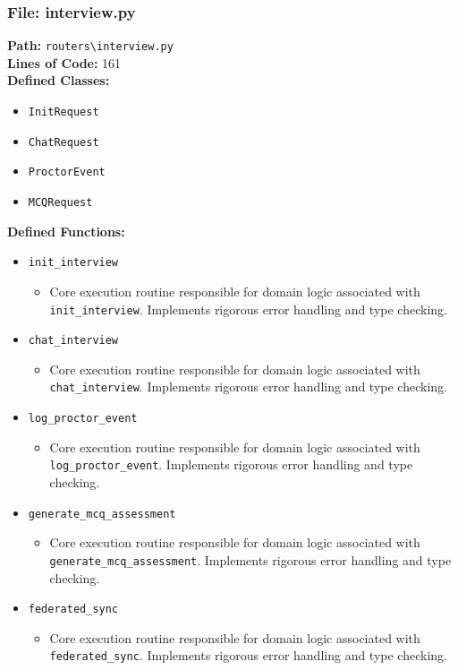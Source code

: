 \documentclass[10pt,journal,compsoc]{IEEEtran}
\begin{document}
\subsubsection{File: interview.py}
\textbf{Path:} \texttt{routers\textbackslash{}interview.py} \\
\textbf{Lines of Code:} 161 \\
\textbf{Defined Classes:}
\begin{itemize}
    \item \texttt{InitRequest}
    \item \texttt{ChatRequest}
    \item \texttt{ProctorEvent}
    \item \texttt{MCQRequest}
\end{itemize}
\textbf{Defined Functions:}
\begin{itemize}
    \item \texttt{init\_interview}
    \begin{itemize} \item Core execution routine responsible for domain logic associated with \texttt{init\_interview}. Implements rigorous error handling and type checking. \end{itemize}
    \item \texttt{chat\_interview}
    \begin{itemize} \item Core execution routine responsible for domain logic associated with \texttt{chat\_interview}. Implements rigorous error handling and type checking. \end{itemize}
    \item \texttt{log\_proctor\_event}
    \begin{itemize} \item Core execution routine responsible for domain logic associated with \texttt{log\_proctor\_event}. Implements rigorous error handling and type checking. \end{itemize}
    \item \texttt{generate\_mcq\_assessment}
    \begin{itemize} \item Core execution routine responsible for domain logic associated with \texttt{generate\_mcq\_assessment}. Implements rigorous error handling and type checking. \end{itemize}
    \item \texttt{federated\_sync}
    \begin{itemize} \item Core execution routine responsible for domain logic associated with \texttt{federated\_sync}. Implements rigorous error handling and type checking. \end{itemize}
\end{itemize}
\end{document}
